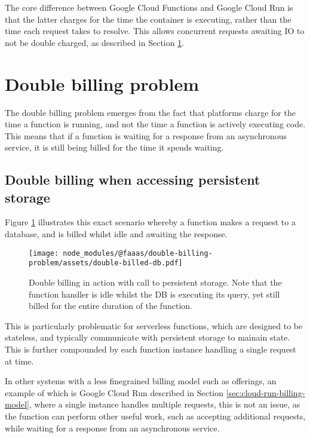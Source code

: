 The core difference between Google Cloud Functions and Google Cloud Run is that the latter charges for the time the container is executing, rather than the time each request takes to resolve. This allows concurrent requests awaiting IO to not be double charged, as described in Section \ref{sec:double-billing-problem}.

\section{Double billing problem}
\label{sec:double-billing-problem}

The double billing problem emerges from the fact that \faas{} platforms charge for the time a function is running, and not the time a function is actively executing code. This means that if a function is waiting for a response from an asynchronous service, it is still being billed for the time it spends waiting.

\subsection{Double billing when accessing persistent storage}
Figure \ref{fig:double-billing-db} illustrates this exact scenario whereby a function makes a request to a database, and is billed whilst idle and awaiting the response.

\begin{figure}[t]
    \texttt{[image: node\_modules/@faaas/double-billing-problem/assets/double-billed-db.pdf]}
    \caption{Double billing in action with call to persistent storage. Note that the function handler is idle whilst the DB is executing its query, yet still billed for the entire duration of the function.}
    \label{fig:double-billing-db}
\end{figure}

This is particularly problematic for serverless functions, which are designed to be stateless, and typically communicate with persistent storage to mainain state. This is further compounded by each function instance handling a single request at time.

In other systems with a less finegrained billing model such as \caas{} offerings, an example of which is Google Cloud Run described in Section \ref{sec:cloud-run-billing-model}, where a single instance handles multiple requests, this is not an issue, as the function can perform other useful work, such as accepting additional requests, while waiting for a response from an asynchronous service.

